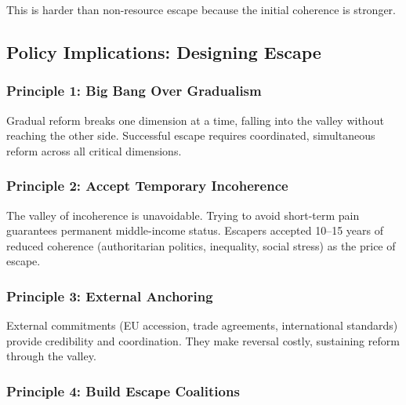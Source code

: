 This is harder than non-resource escape because the initial coherence is stronger.

\subsection{Policy Implications: Designing Escape}

\subsubsection{Principle 1: Big Bang Over Gradualism}

\begin{tcolorbox}[colback=yellow!5!white, colframe=yellow!75!black]
Gradual reform breaks one dimension at a time, falling into the valley 
without reaching the other side. Successful escape requires coordinated, 
simultaneous reform across all critical dimensions.
\end{tcolorbox}

\subsubsection{Principle 2: Accept Temporary Incoherence}

\begin{tcolorbox}[colback=yellow!5!white, colframe=yellow!75!black]
The valley of incoherence is unavoidable. Trying to avoid short-term pain 
guarantees permanent middle-income status. Escapers accepted 10--15 years 
of reduced coherence (authoritarian politics, inequality, social stress) 
as the price of escape.
\end{tcolorbox}

\subsubsection{Principle 3: External Anchoring}

\begin{tcolorbox}[colback=yellow!5!white, colframe=yellow!75!black]
External commitments (EU accession, trade agreements, international standards) 
provide credibility and coordination. They make reversal costly, sustaining 
reform through the valley.
\end{tcolorbox}

\subsubsection{Principle 4: Build Escape Coalitions}

